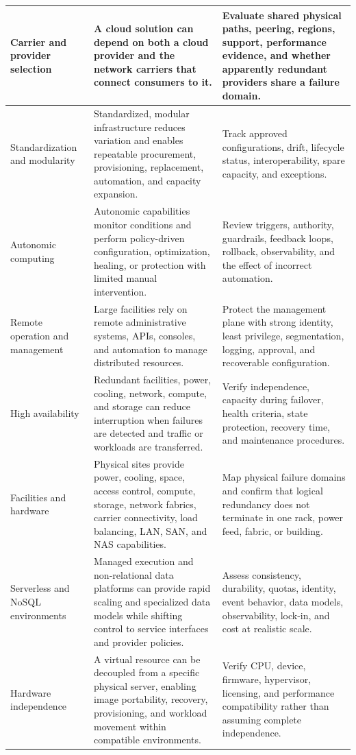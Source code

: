 \documentclass[11pt]{article}
\begin{document}
\begin{longtable}{@{}>{\RaggedRight\arraybackslash}p{}>{\RaggedRight\arraybackslash}p{}>{\RaggedRight\arraybackslash}p{}@{}}
Carrier and provider selection & A cloud solution can depend on both a cloud provider and the network carriers that connect consumers to it. & Evaluate shared physical paths, peering, regions, support, performance evidence, and whether apparently redundant providers share a failure domain. \\\midrule
Standardization and modularity & Standardized, modular infrastructure reduces variation and enables repeatable procurement, provisioning, replacement, automation, and capacity expansion. & Track approved configurations, drift, lifecycle status, interoperability, spare capacity, and exceptions. \\\midrule
Autonomic computing & Autonomic capabilities monitor conditions and perform policy-driven configuration, optimization, healing, or protection with limited manual intervention. & Review triggers, authority, guardrails, feedback loops, rollback, observability, and the effect of incorrect automation. \\\midrule
Remote operation and management & Large facilities rely on remote administrative systems, APIs, consoles, and automation to manage distributed resources. & Protect the management plane with strong identity, least privilege, segmentation, logging, approval, and recoverable configuration. \\\midrule
High availability & Redundant facilities, power, cooling, network, compute, and storage can reduce interruption when failures are detected and traffic or workloads are transferred. & Verify independence, capacity during failover, health criteria, state protection, recovery time, and maintenance procedures. \\\midrule
Facilities and hardware & Physical sites provide power, cooling, space, access control, compute, storage, network fabrics, carrier connectivity, load balancing, LAN, SAN, and NAS capabilities. & Map physical failure domains and confirm that logical redundancy does not terminate in one rack, power feed, fabric, or building. \\\midrule
Serverless and NoSQL environments & Managed execution and non-relational data platforms can provide rapid scaling and specialized data models while shifting control to service interfaces and provider policies. & Assess consistency, durability, quotas, identity, event behavior, data models, observability, lock-in, and cost at realistic scale. \\\midrule
Hardware independence & A virtual resource can be decoupled from a specific physical server, enabling image portability, recovery, provisioning, and workload movement within compatible environments. & Verify CPU, device, firmware, hypervisor, licensing, and performance compatibility rather than assuming complete independence. \\\midrule

\end{longtable}
\end{document}
